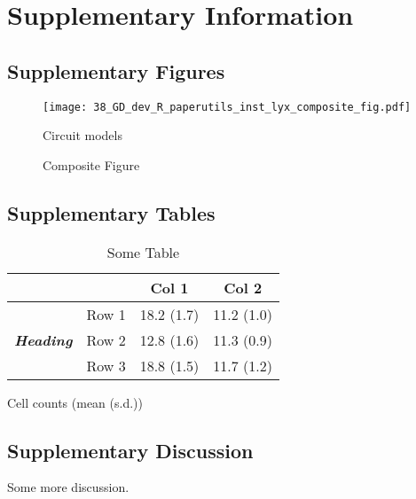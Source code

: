 \documentclass[11pt,british,super,sort&compress]{article}
\providecommand{\tabularnewline}{\\}
\begin{document}
\section{Supplementary Information}


\subsection{Supplementary Figures}

\begin{figure}[H]
\begin{centering}
\texttt{[image: 38\_GD\_dev\_R\_paperutils\_inst\_lyx\_composite\_fig.pdf]}
\par\end{centering}

\begin{centering}
\caption{\label{fig:S_wtCartoons}Composite Figure}

\par\end{centering}

{\footnotesize Circuit models }
\end{figure}


\clearpage{}


\subsection{Supplementary Tables}

\begin{table}[h]
\begin{centering}
\caption{\textbf{\label{tab:S_cellcounts}}Some Table}

\par\end{centering}

\vspace{0.5cm}


\begin{centering}
\begin{tabular}{|c|c|c|c|}
\cline{3-4} 
\multicolumn{2}{c|}{} &
\textbf{Col 1} &
\textbf{Col 2}\tabularnewline
\hline 
\multirow{3}{*}{\textbf{\emph{Heading}}} &
Row 1 &
18.2 (1.7) &
11.2 (1.0)\tabularnewline
\cline{2-4} 
 & Row 2 &
12.8 (1.6) &
11.3 (0.9)\tabularnewline
\cline{2-4} 
 & Row 3 &
18.8 (1.5) &
11.7 (1.2)\tabularnewline
\hline 
\end{tabular}
\par\end{centering}

\vspace{0.5cm}


{\footnotesize Cell counts (mean (s.d.))}
\end{table}
\clearpage{}


\subsection{Supplementary Discussion}

Some more discussion.
\end{document}
